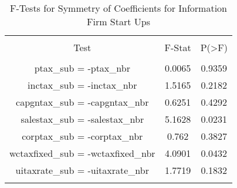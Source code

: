
\begin{table}[!htbp] \centering 
  \caption{F-Tests for Symmetry of Coefficients for Information Firm Start Ups} 
  \label{51Ftests} 
\begin{tabular}{@{\extracolsep{5pt}} ccc} 
\\[-1.8ex]\hline 
\hline \\[-1.8ex] 
Test & F-Stat & P(\textgreater F) \\ 
\hline \\[-1.8ex] 
ptax\_sub = -ptax\_nbr & 0.0065 & 0.9359 \\ 
inctax\_sub = -inctax\_nbr & 1.5165 & 0.2182 \\ 
capgntax\_sub = -capgntax\_nbr & 0.6251 & 0.4292 \\ 
salestax\_sub = -salestax\_nbr & 5.1628 & 0.0231 \\ 
corptax\_sub = -corptax\_nbr & 0.762 & 0.3827 \\ 
wctaxfixed\_sub = -wctaxfixed\_nbr & 4.0901 & 0.0432 \\ 
uitaxrate\_sub = -uitaxrate\_nbr & 1.7719 & 0.1832 \\ 
\hline \\[-1.8ex] 
\end{tabular} 
\end{table} 
